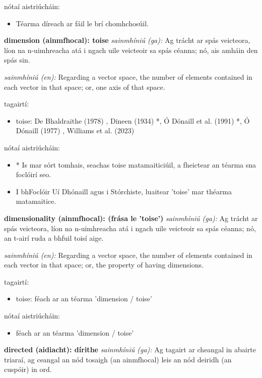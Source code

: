 \documentclass{article}
\begin{document}
nótaí aistriúcháin:
\begin{itemize}
	\item Téarma díreach ar fáil le brí chomhchosúil.
\end{itemize}


\textbf{dimension (ainmfhocal): toise}
\textit{sainmhíniú (ga):} Ag trácht ar spás veicteora, líon na n-uimhreacha atá i ngach uile veicteoir sa spás céanna; nó, ais amháin den spás sin.

\textit{sainmhíniú (en):} Regarding a vector space, the number of elements contained in each vector in that space; or, one axis of that space.

tagairtí:
\begin{itemize}
	\item toise: De Bhaldraithe (1978) \cite{de-bhaldraithe}, Dineen (1934) \cite{dineen}*, Ó Dónaill et al. (1991) \cite{focloir-beag}*, Ó Dónaill (1977) \cite{odonaill}, Williams et al. (2023) \cite{storchiste}
\end{itemize}

nótaí aistriúcháin:
\begin{itemize}
	\item * Is mar sórt tomhais, seachas toise matamaiticiúil, a fheictear an téarma sna foclóirí seo.
	\item I bhFoclóir Uí Dhónaill agus i Stórchiste, luaitear 'toise' mar théarma matamaitice.
\end{itemize}


\textbf{dimensionality (ainmfhocal): (frása le 'toise')}
\textit{sainmhíniú (ga):} Ag trácht ar spás veicteora, líon na n-uimhreacha atá i ngach uile veicteoir sa spás céanna; nó, an t-airí ruda a bhfuil toisí aige.

\textit{sainmhíniú (en):} Regarding a vector space, the number of elements contained in each vector in that space; or, the property of having dimensions.

tagairtí:
\begin{itemize}
	\item toise: féach ar an téarma 'dimension / toise'
\end{itemize}

nótaí aistriúcháin:
\begin{itemize}
	\item féach ar an téarma 'dimension / toise'
\end{itemize}


\textbf{directed (aidiacht): dírithe}
\textit{sainmhíniú (ga):} Ag tagairt ar cheangal in abairte triaraí, ag ceangal an nód tosaigh (an ainmfhocal) leis an nód deiridh (an cuspóir) in ord.
\end{document}
